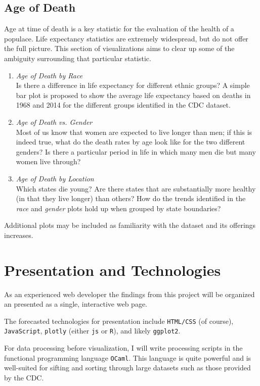 \subsection{Age of Death}

Age at time of death is a key statistic for the evaluation of the health of a populace. Life expectancy statistics are extremely widespread, but do not offer the full picture. This section of visualizations aims to clear up some of the ambiguity surrounding that particular statistic.

\begin{enumerate}
\item \textit{Age of Death by Race}\\
Is there a difference in life expectancy for different ethnic groups? A simple bar plot is proposed to show the average life expectancy based on deaths in 1968 and 2014 for the different groups identified in the CDC dataset.

\item \textit{Age of Death vs. Gender}\\
Most of us know that women are expected to live longer than men; if this is indeed true, what do the death rates by age look like for the two different genders? Is there a particular period in life in which many men die but many women live through?

\item \textit{Age of Death by Location}\\
Which states die young? Are there states that are substantially more healthy (in that they live longer) than others? How do the trends identified in the \textit{race} and \textit{gender} plots hold up when grouped by state boundaries?

\end{enumerate}

Additional plots may be included as familiarity with the dataset and its offerings increases.


\section{Presentation and Technologies}

As an experienced web developer the findings from this project will be organized an presented as a single, interactive web page.

The forecasted technologies for presentation include \texttt{HTML/CSS} (of course), \texttt{JavaScript}, \texttt{plotly} (either \texttt{js} or \texttt{R}), and likely \texttt{ggplot2}.

For data processing before visualization, I will write processing scripts in the functional programming language \texttt{OCaml}. This language is quite powerful and is well-suited for sifting and sorting through large datasets such as those provided by the CDC.

